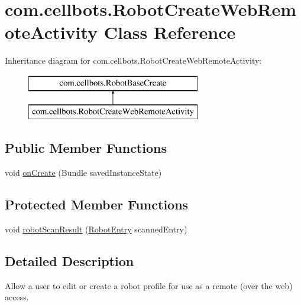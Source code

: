 \hypertarget{classcom_1_1cellbots_1_1_robot_create_web_remote_activity}{\section{com.\-cellbots.\-Robot\-Create\-Web\-Remote\-Activity Class Reference}
\label{classcom_1_1cellbots_1_1_robot_create_web_remote_activity}
}
Inheritance diagram for com.\-cellbots.\-Robot\-Create\-Web\-Remote\-Activity\-:\begin{figure}[H]
\begin{center}
\leavevmode
\includegraphics[height=2.000000cm]{classcom_1_1cellbots_1_1_robot_create_web_remote_activity}
\end{center}
\end{figure}
\subsection*{Public Member Functions}
\begin{DoxyCompactItemize}
\item 
void \hyperlink{classcom_1_1cellbots_1_1_robot_create_web_remote_activity_acd9708d99c328560293aae7865aa98cc}{on\-Create} (Bundle saved\-Instance\-State)
\end{DoxyCompactItemize}
\subsection*{Protected Member Functions}
\begin{DoxyCompactItemize}
\item 
void \hyperlink{classcom_1_1cellbots_1_1_robot_create_web_remote_activity_a24e4ff4809baea1bb353570934feec1c}{robot\-Scan\-Result} (\hyperlink{classcom_1_1cellbots_1_1_robot_entry}{Robot\-Entry} scanned\-Entry)
\end{DoxyCompactItemize}


\subsection{Detailed Description}
Allow a user to edit or create a robot profile for use as a remote (over the web) access.


